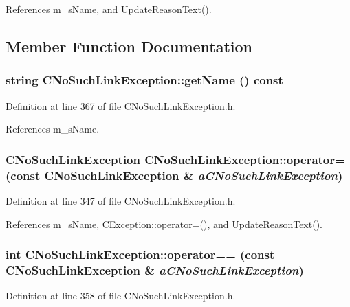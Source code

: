 References m\_\-s\-Name, and Update\-Reason\-Text().

\subsection{Member Function Documentation}
\subsubsection{\setlength{\rightskip}{0pt plus 5cm}string CNo\-Such\-Link\-Exception::get\-Name () const\hspace{0.3cm}{\tt  [inline]}}\label{classCNoSuchLinkException_a10}




Definition at line 367 of file CNo\-Such\-Link\-Exception.h.

References m\_\-s\-Name.
\subsubsection{\setlength{\rightskip}{0pt plus 5cm}CNo\-Such\-Link\-Exception CNo\-Such\-Link\-Exception::operator= (const CNo\-Such\-Link\-Exception \& {\em a\-CNo\-Such\-Link\-Exception})\hspace{0.3cm}{\tt  [inline]}}\label{classCNoSuchLinkException_a8}




Definition at line 347 of file CNo\-Such\-Link\-Exception.h.

References m\_\-s\-Name, CException::operator=(), and Update\-Reason\-Text().
\subsubsection{\setlength{\rightskip}{0pt plus 5cm}int CNo\-Such\-Link\-Exception::operator== (const CNo\-Such\-Link\-Exception \& {\em a\-CNo\-Such\-Link\-Exception})\hspace{0.3cm}{\tt  [inline]}}\label{classCNoSuchLinkException_a9}




Definition at line 358 of file CNo\-Such\-Link\-Exception.h.

